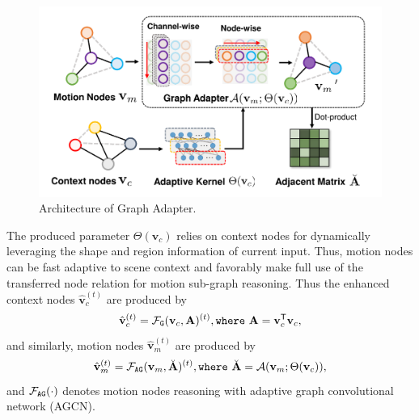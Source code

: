 \documentclass[letterpaper]{article} %
\begin{document}
\begin{figure}[pt]
	\begin{center}
		\includegraphics[width=1\linewidth]{figs/fig3_crop.pdf}
	\end{center}
	\caption{Architecture of Graph Adapter.}
	\label{fig:3}
\end{figure}

The produced parameter $\Theta({\mathbf v}_c)$ relies on context nodes for dynamically leveraging the shape and region information of current input. Thus, motion nodes can be fast adaptive to scene context and favorably make full use of the transferred node relation for motion sub-graph reasoning.
Thus the enhanced context nodes $\hat{\mathbf v}_c^{(t)}$ are produced by
\begin{equation}
	\hat{\mathbf v}_c^{(t)} = {\cal F}_{\tt G}({\mathbf v}_c, {\mathbf A})^{(t)}, {\tt where}~ {\mathbf A} = {\mathbf v}_c^{\mathsf T}{\mathbf v}_c,
\end{equation}
and similarly, motion nodes $\hat{\mathbf v}_m^{(t)}$ are produced by
\begin{equation}
	\hat{\mathbf v}_m^{(t)} = {\cal F}_{\tt AG}({\mathbf v}_m, \breve{\mathbf A})^{(t)}, {\tt where}~ \breve{\mathbf A} = {\cal A}({\mathbf v}_m; \Theta({\mathbf v}_c)),
\end{equation}
and ${\cal F}_{\tt AG}(\cdot)$ denotes motion nodes reasoning with adaptive graph convolutional network (AGCN).
\end{document}
